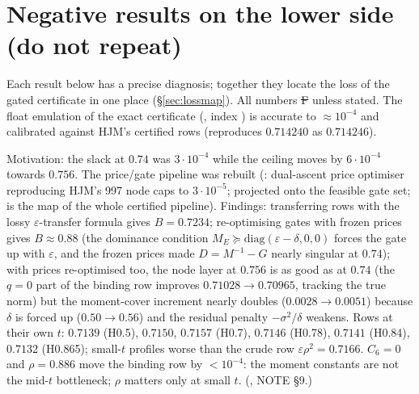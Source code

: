 \section{Negative results on the lower side (do not repeat)}\label{ch:negatives}

Each result below has a precise diagnosis; together they locate the loss of the gated certificate in one place (\S\ref{sec:lossmap}). All
numbers \st{F} unless stated. The float emulation of the exact certificate (, index ) is accurate to
$\approx10^{-4}$ and calibrated against HJM's certified rows (reproduces $0.714240$ as $0.714246$).

\begin{negative}[$\varepsilon=0.756$ with the HJM-type gates]\label{neg:eps}
Motivation: the slack at $0.74$ was $3\cdot10^{-4}$ while the ceiling moves by $6\cdot10^{-4}$ towards $0.756$. The price/gate pipeline was rebuilt
(: dual-ascent price optimiser reproducing HJM's 997 node caps to $3\cdot10^{-5}$;  projected onto the
feasible gate set;  is the map of the whole certified pipeline). Findings: transferring rows with the lossy $\varepsilon$-transfer
formula gives $B=0.7234$; re-optimising gates with frozen prices gives $B\approx0.88$ (the dominance condition $M_E\succeq\mathrm{diag}(\varepsilon-\delta,0,0)$
forces the gate up with $\varepsilon$, and the frozen prices made $D=M^{-1}-G$ nearly singular at $0.74$); with prices re-optimised too, the node layer at
$0.756$ is as good as at $0.74$ (the $q=0$ part of the binding row improves $0.71028\to0.70965$, tracking the true norm) but the moment-cover increment
nearly doubles ($0.0028\to0.0051$) because $\delta$ is forced up ($0.50\to0.56$) and the residual penalty $-\sigma^2/\delta$ weakens. Rows at their own $t$:
$0.7139$ (H0.5), $0.7150$, $0.7157$ (H0.7), $0.7146$ (H0.78), $0.7141$ (H0.84), $0.7132$ (H0.865); small-$t$ profiles worse than the crude row
$\varepsilon\rho^2=0.7166$. $C_6=0$ and $\rho=0.886$ move the binding row by $<10^{-4}$: the moment constants are not the mid-$t$ bottleneck; $\rho$ matters only
at small $t$. (, NOTE \S9.)
\end{negative}

